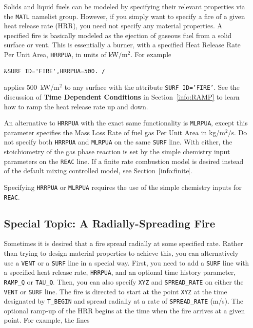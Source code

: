 \documentclass[11pt]{book}
\newcommand{\ct}{\tt\small}
\begin{document}
\label{info:gas_burner}

Solids and liquid fuels can be modeled by specifying their relevant
properties via the {\ct MATL} namelist group. However, if you simply
want to specify a fire of a given heat release rate (HRR),
you need not specify any material properties. A specified fire is
basically modeled as the ejection of gaseous fuel
from a solid surface or vent. This is essentially a burner, with a
specified Heat Release Rate Per Unit Area, {\ct HRRPUA}, in units of
kW/m$^2$. For example

\footnotesize
\begin{verbatim}
&SURF ID='FIRE',HRRPUA=500. /
\end{verbatim}
\normalsize

\noindent
applies 500~kW/m$^2$ to any surface with the attribute
{\ct SURF\_ID='FIRE'}. See the discussion of {\bf Time Dependent Conditions}
in Section~\ref{info:RAMP} to learn how to ramp the heat release rate up and down.

An alternative to {\ct HRRPUA} with the exact same functionality is
{\ct MLRPUA}, except this parameter
specifies the Mass Loss Rate of fuel gas Per Unit Area in kg/m$^2$/s. Do not specify both
{\ct HRRPUA} and {\ct MLRPUA} on the same {\ct SURF} line. With either,
the stoichiometry of the gas phase reaction is set by the simple chemistry input
parameters on the {\ct REAC} line.
If a finite rate combustion model is desired instead of the default mixing controlled model, see Section~\ref{info:finite}.

\begin{warning}
Specifying {\ct HRRPUA} or {\ct MLRPUA} requires the use of the simple chemistry inputs for {\ct REAC}.
\end{warning}



\subsection{Special Topic: A Radially-Spreading Fire}
\label{info:spread}

Sometimes it is desired that a fire spread radially at some specified
rate. Rather than trying to design material properties
to achieve this, you can alternatively use a {\ct VENT} or a {\ct SURF} line in a special way.
First, you need to add a {\ct SURF} line with
a specified heat release rate, {\ct HRRPUA}, and an optional
time history parameter, {\ct RAMP\_Q} or {\ct TAU\_Q}. Then, you can also specify {\ct XYZ} and {\ct SPREAD\_RATE} on either the {\ct VENT} or {\ct SURF} line.
The fire is directed to start at the point {\ct XYZ} at the time designated by {\ct T\_BEGIN} and spread
radially at a rate of {\ct SPREAD\_RATE} (m/s). The optional ramp-up of the HRR begins at
the time when the fire arrives at a given point.
For example, the lines
\end{document}
